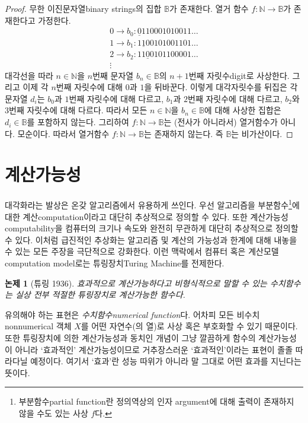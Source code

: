 \documentclass[a4paper,chapter,atbegshi]{oblivoir}
\newtheorem{thes}{논제}[chapter]
\begin{document}
\begin{proof}
  무한 이진문자열{\tiny binary strings}의 집합 $\mathbb{B}$가 존재한다.
  열거 함수 $f:\mathbb{N}\rightarrow\mathbb{B}$가 존재한다고 가정한다.
  \[
    \begin{matrix}
      0\rightarrow b_0:\underline{0}110001010011\ldots\\
      1\rightarrow b_1:1\underline{1}00101001101\ldots\\
      2\rightarrow b_2:11\underline{0}0101100001\ldots\\
      \vdots
    \end{matrix}
  \]
  대각선을 따라 $n\in\mathbb{N}$을 $n$번째 문자열 $b_n\in\mathbb{B}$의 $n+1$번째
  자릿수{\tiny digit}로 사상한다. 그리고 이제 각 $n$번째 자릿수에 대해
  $0$과 $1$을 뒤바꾼다. 이렇게 대각자릿수를 뒤집은 각 문자열 $d_i$는 $b_0$과
  $1$번째 자릿수에 대해 다르고, $b_1$과 $2$번째 자릿수에 대해 다르고, $b_2$와
  $3$번째 자릿수에 대해 다르다. 따라서 모든 $n\in\mathbb{N}$을 
  $b_n\in\mathbb{B}$에 대해 사상한 집합은 $d_i\in\mathbb{B}$를 포함하지 않는다.
  그리하여 $f:\mathbb{N}\rightarrow\mathbb{B}$는 (전사가 아니라서) 열거함수가
  아니다. 모순이다. 따라서 열거함수 $f:\mathbb{N}\rightarrow\mathbb{B}$는
  존재하지 않는다. 즉 $\mathbb{B}$는 비가산이다.
\end{proof}
\section{계산가능성}
대각화라는 발상은 온갖 알고리즘에서 유용하게 쓰인다. 우선 알고리즘을 
부분함수\footnote{부분함수{\tiny partial function}란 정의역상의 인자{\tiny
argument}에 대해 출력이 존재하지 않을 수도 있는 사상 $f$다.}에 
대한 계산{\tiny computation}이라고 대단히 추상적으로 정의할 수 있다. 또한
계산가능성{\tiny computability}을 컴퓨터의 크기나 속도와
완전히 무관하게 대단히 추상적으로 정의할 수 있다. 이처럼 급진적인 추상화는
알고리즘 및 계산의 가능성과 한계에 대해 내놓을 수 있는 모든 주장을 극단적으로
강화한다. 이런 맥락에서 컴퓨터 혹은 계산모델{\tiny computation model}로는
튜링장치{\tiny Turing Machine}를 전제한다.
\begin{thes}[튜링 1936]
  효과적으로 계산가능하다고 비형식적으로 말할 수 있는 수치함수는 실상
  전부 적절한 튜링장치로 계산가능한 함수다.
\end{thes}
유의해야 하는 표현은 \emph{수치함수\tiny numerical function}다. 어차피 모든
비수치{\tiny nonnumerical} 객체 $X$를 어떤 자연수(의 열)로 사상 혹은 부호화할
수 있기 때문이다. 또한 튜링장치에 의한 계산가능성과 동치인 개념이 그냥
깔끔하게 함수의 계산가능성이 아니라 `효과적인' 계산가능성이므로
거추장스러운 `효과적인'이라는 표현이 졸졸 따라다닐 예정이다. 
여기서 `효과'란 성능 따위가 아니라 말 그대로 어떤 효과를 지닌다는
뜻이다. 
\end{document}
